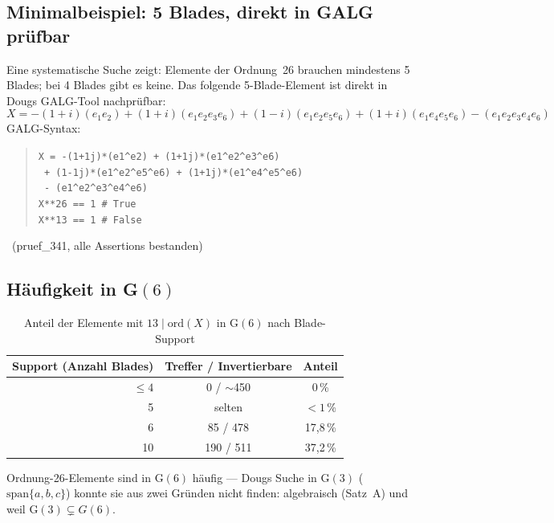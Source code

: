 \subsection{Minimalbeispiel: 5 Blades, direkt in GALG prüfbar}
\label{sec:minimal}

Eine systematische Suche zeigt: Elemente der Ordnung~26 brauchen mindestens
5 Blades; bei 4 Blades gibt es keine. Das folgende 5-Blade-Element
ist direkt in Dougs GALG-Tool nachprüfbar:
\begin{equation}
  X = -(1+i)(e_1 e_2) + (1+i)(e_1 e_2 e_3 e_6) + (1-i)(e_1 e_2 e_5 e_6)
      + (1+i)(e_1 e_4 e_5 e_6) - (e_1 e_2 e_3 e_4 e_6)
\end{equation}
GALG-Syntax:
\begin{quote}
\texttt{X = -(1+1j)*(e1\^{}e2) + (1+1j)*(e1\^{}e2\^{}e3\^{}e6)}\\
\texttt{  + (1-1j)*(e1\^{}e2\^{}e5\^{}e6) + (1+1j)*(e1\^{}e4\^{}e5\^{}e6)}\\
\texttt{  - (e1\^{}e2\^{}e3\^{}e4\^{}e6)}\\
\texttt{X**26 == 1  \# True}\\
\texttt{X**13 == 1  \# False}
\end{quote}
\BM\ (pruef\_341, alle Assertions bestanden)

\subsection{Häufigkeit in G$(6)$}

\begin{table}[H]
\centering
\caption{Anteil der Elemente mit $13 \mid \text{ord}(X)$ in G$(6)$ nach Blade-Support}
\begin{tabular}{rcc}
\toprule
Support (Anzahl Blades) & Treffer / Invertierbare & Anteil \\
\midrule
$\leq 4$ & 0 / $\sim$450 & 0\,\% \\
5 & selten & $< 1$\,\% \\
6 & 85 / 478 & 17{,}8\,\% \\
10 & 190 / 511 & 37{,}2\,\% \\
\bottomrule
\end{tabular}
\end{table}

Ordnung-26-Elemente sind in G$(6)$ häufig --- Dougs Suche in G$(3)$
($\text{span}\{a,b,c\}$) konnte sie aus zwei Gründen nicht finden:
algebraisch (Satz~A) und weil G$(3) \subsetneq G(6)$.


